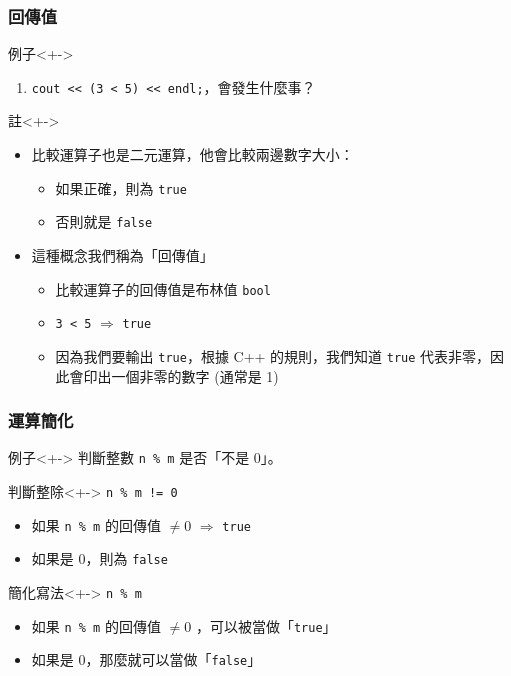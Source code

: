 \documentclass[utf8]{beamer}
\begin{document}
\begin{CJK}{UTF8}{bkai}
\begin{frame}[fragile]
  \frametitle{回傳值}
  \begin{block}{例子}<+->
    \begin{enumerate}
    \item \lstinline{cout << (3 < 5) << endl;}{}，會發生什麼事？
    \end{enumerate}
  \end{block}
  \begin{exampleblock}{註}<+->
    \begin{itemize}
    \item 比較運算子也是\alert{二元運算}，他會比較兩邊數字大小：
      \begin{itemize}[<+->]
      \item 如果正確，則為 \lstinline{true}{}
      \item 否則就是 \lstinline{false}{}
      \end{itemize}
    \item<+-> 這種概念我們稱為「\alert{回傳值}」
      \begin{itemize}[<+->]
      \item 比較運算子的回傳值是布林值 \lstinline{bool}{}
      \item \alert{\lstinline{3 < 5}{}} $\Rightarrow$ \lstinline{true}{}
      \item 因為我們要輸出 \lstinline{true}{}，根據 C++ 的規則，我們知道 \lstinline{true}{} 代表\alert{非零}，因此會印出一個非零的數字 (通常是 1)
      \end{itemize}
    \end{itemize}
  \end{exampleblock}
\end{frame}

\begin{frame}[fragile]
  \frametitle{運算簡化}
  \begin{block}{例子}<+->
  判斷整數 \lstinline{n % m}{} 是否「不是 0」。
  \end{block}
  \begin{exampleblock}{判斷整除}<+->
    \lstinline{n % m != 0}{}
    \begin{itemize}[<+->]
    \item 如果 \lstinline{n % m}{} 的回傳值 $\neq{0}$ $\Rightarrow$ \lstinline{true}{}
    \item 如果是 0，則為 \lstinline{false}{}
    \end{itemize}
  \end{exampleblock}
  \begin{alertblock}{簡化寫法}<+->
    \lstinline{n % m}{}
    \begin{itemize}[<+->]
    \item 如果 \lstinline{n % m}{} 的回傳值 $\neq{0}$ ，可以被當做「\lstinline{true}{}」
    \item 如果是 0，那麼就可以當做「\lstinline{false}{}」
    \end{itemize}
  \end{alertblock}
\end{frame}


\end{CJK}
\end{document}
